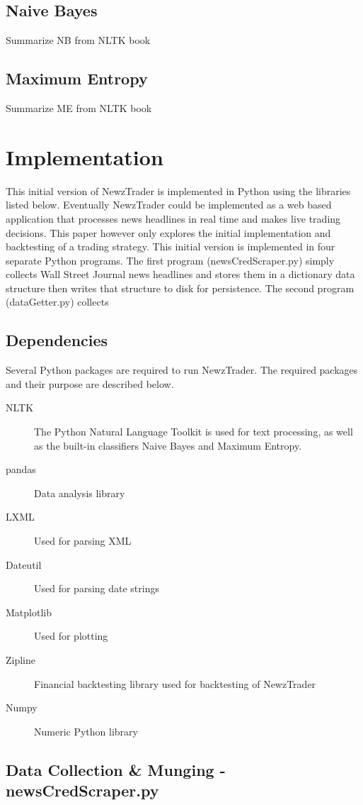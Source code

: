 \documentclass[]{article}
\begin{document}
\subsection{Naive Bayes}
Summarize NB from NLTK book
\subsection{Maximum Entropy}
Summarize ME from NLTK book

\section{Implementation}
This initial version of NewzTrader is implemented in Python using the libraries listed below.  Eventually NewzTrader could be implemented as a web based application that processes news headlines in real time and makes live trading decisions.  This paper however only explores the initial implementation and backtesting of a trading strategy.  This initial version is implemented in four separate Python programs. The first program (newsCredScraper.py) simply collects Wall Street Journal news headlines and stores them in a dictionary data structure then writes that structure to disk for persistence.  The second program (dataGetter.py) collects 
\subsection{Dependencies}
Several Python packages are required to run NewzTrader.  The required packages and their purpose are described below.
\begin{description}
 
\item[NLTK] The Python Natural Language Toolkit is used for text processing, as well as the built-in classifiers Naive Bayes and Maximum Entropy. 

\item[pandas] Data analysis library
\item[LXML] Used for parsing XML
\item[Dateutil] Used for parsing date strings
\item[Matplotlib] Used for plotting
\item[Zipline] Financial backtesting library used for backtesting of NewzTrader
\item[Numpy] Numeric Python library

\end{description}
\subsection{Data Collection \& Munging - newsCredScraper.py}
\end{document}
